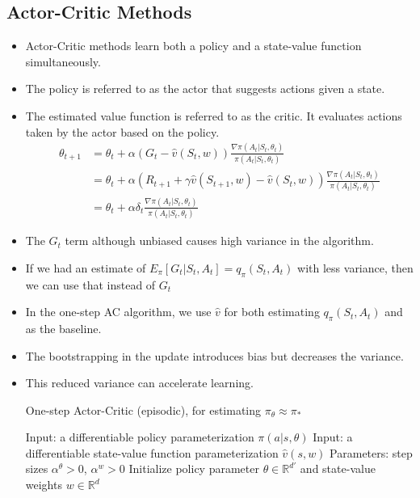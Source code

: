 \documentclass[a4paper]{article}
\begin{document}
\subsection{Actor-Critic Methods}
\begin{itemize}
    \item Actor-Critic methods learn both a policy and a state-value function simultaneously.
    \item The policy is referred to as the actor that suggests actions given a state.
    \item The estimated value function is referred to as the critic. It evaluates actions taken by the actor based on the policy.
    \begin{equation*}
        \begin{split}
            \theta_{t+1}&=\theta_t+\alpha (G_t-\hat{v}(S_t,w))\frac{\nabla \pi(A_t|S_t,\theta_t)}{\pi(A_t|S_t,\theta_t)}\\
            &=\theta_t+\alpha(R_{t+1}+\gamma \hat{v}(S_{t+1},w)-\hat{v}(S_t,w))\frac{\nabla \pi(A_t|S_t,\theta_t)}{\pi(A_t|S_t,\theta_t)}\\
            &=\theta_t+\alpha \delta_t\frac{\nabla \pi(A_t|S_t,\theta_t)}{\pi(A_t|S_t,\theta_t)}
        \end{split}
    \end{equation*}
    \item The $G_t$ term although unbiased causes high variance in the algorithm.
    \item If we had an estimate of $E_\pi[G_t|S_t,A_t]=q_\pi(S_t,A_t)$ with less variance, then we can use that instead of $G_t$
    \item In the one-step AC algorithm, we use $\hat{v}$ for both estimating $q_\pi(S_t,A_t)$ and as the baseline.
    \item The bootstrapping in the update introduces bias but decreases the variance.
    \item This reduced variance can accelerate learning.
    \begin{algorithm}[H]
        \caption{One-step Actor-Critic (episodic), for estimating $\pi_\theta \approx \pi_*$}
        \begin{algorithmic}[1]
            \State Input: a differentiable policy parameterization $\pi(a|s,\theta)$
            \State Input: a differentiable state-value function parameterization $\hat{v}(s,w)$
            \State Parameters: step sizes $\alpha^\theta>0$, $\alpha^w>0$
            \State Initialize policy parameter $\theta \in \mathbb{R}^{d'}$ and state-value weights $w\in \mathbb{R}^d$

\end{algorithmic}
\end{algorithm}
\end{itemize}
\end{document}
